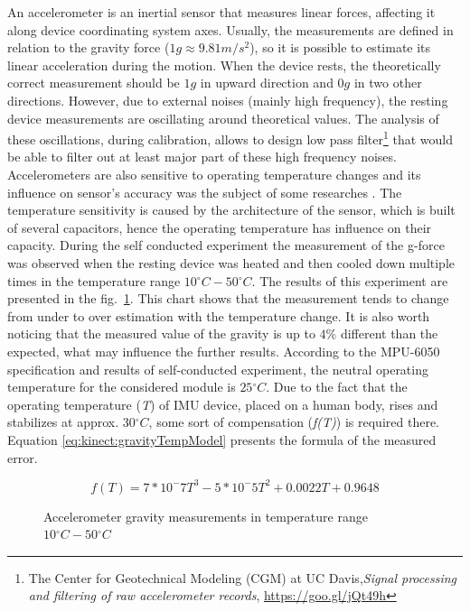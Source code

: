 \documentclass[sensors,article,submit,moreauthors,pdftex,10pt,a4paper]{mdpi}
\newcommand{\degree}{\ensuremath{{}^{\circ}}\xspace}
\begin{document}
	
An accelerometer is an inertial sensor that measures linear forces, affecting it along device coordinating system axes. Usually, the measurements are defined in relation to the gravity force ($1g \approx 9.81  m/{s^2}$), so it is possible to estimate its linear acceleration during the motion. When the device rests, the theoretically correct measurement should be $1g$ in upward direction and $0g$ in two other directions. However, due to external noises (mainly high frequency), the resting device measurements are oscillating around theoretical values. The analysis of these oscillations, during calibration, allows to design low pass filter\footnote{The Center for Geotechnical Modeling (CGM) at UC Davis,\textit{Signal processing and filtering of raw accelerometer records}, \url{https://goo.gl/jQt49h}}\cite{Wang2011} that would be able to filter out at least major part of these high frequency noises. Accelerometers are also sensitive to operating temperature changes and its influence on sensor’s accuracy was the subject of some researches \cite{Schneider2006, Grigorie1996}. The temperature sensitivity is caused by the architecture of the sensor, which is built of several capacitors, hence the operating temperature has influence on their capacity. During the self conducted experiment the measurement of the g-force was observed when the resting device was heated and then cooled down multiple times in the temperature range $10\degree C - 50\degree C$. The results of this experiment are presented in the fig.~\ref{fig:imu:tmep}. This chart shows that the measurement tends to change from under to over estimation with the temperature change. It is also worth noticing that the measured value of the gravity is up to $4\%$ different than the expected, what may influence the further results. According to the MPU-6050 specification and results of self-conducted experiment, the neutral operating temperature for the considered module is $25\degree C$. Due to the fact that the operating temperature (\emph{T}) of IMU device, placed on a human body, rises and stabilizes at approx. $30 \degree C$, some sort of compensation (\emph{f(T)}) is required there. Equation \ref{eq:kinect:gravityTempModel} presents the formula of the measured error.
	
\begin{equation}
	f(T) = 7*10^-7 T^3 - 5*10^-5 T^2 + 0.0022T + 0.9648
	\label{eq:kinect:gravityTempModel}
\end{equation}
	
\begin{figure}[H] %
	\centering
		
	\caption{Accelerometer gravity measurements in temperature range $10\degree C - 50\degree C$}
	\label{fig:imu:tmep}
\end{figure}
	
\end{document}

